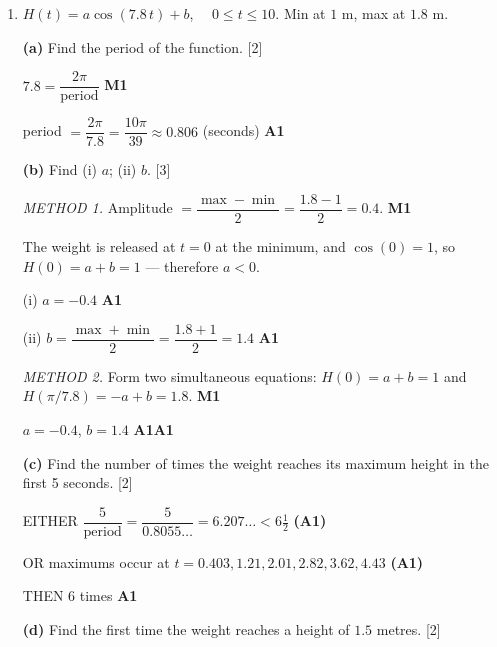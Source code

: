 \documentclass[12pt, twoside]{article}
\begin{document}
\begin{enumerate}[itemsep=0.3cm]
$= 20.8$ (metres) \hfill \textbf{A1}

\bigskip
\hrule
\bigskip

\item[2.] [Maximum mark: 13]

$H(t) = a\cos(7.8\,t) + b$, $\quad 0 \le t \le 10$. Min at $1$ m, max at $1.8$ m.

\medskip

\textbf{(a)} Find the period of the function. \hfill [2]

\medskip

$7.8 = \dfrac{2\pi}{\text{period}}$ \hfill \textbf{M1}

period $= \dfrac{2\pi}{7.8} = \dfrac{10\pi}{39} \approx 0.806$ (seconds) \hfill \textbf{A1}

\medskip

\textbf{(b)} Find (i) $a$; \quad (ii) $b$. \hfill [3]

\medskip

\emph{METHOD 1.} Amplitude $= \dfrac{\max - \min}{2} = \dfrac{1.8 - 1}{2} = 0.4$. \hfill \textbf{M1}

The weight is released at $t = 0$ at the minimum, and $\cos(0) = 1$, so $H(0) = a + b = 1$ — therefore $a < 0$.

(i) $a = -0.4$ \hfill \textbf{A1}

(ii) $b = \dfrac{\max + \min}{2} = \dfrac{1.8 + 1}{2} = 1.4$ \hfill \textbf{A1}

\medskip

\emph{METHOD 2.} Form two simultaneous equations: $H(0) = a + b = 1$ and $H(\pi/7.8) = -a + b = 1.8$. \hfill \textbf{M1}

$a = -0.4$, $b = 1.4$ \hfill \textbf{A1A1}

\medskip

\textbf{(c)} Find the number of times the weight reaches its maximum height in the first 5 seconds. \hfill [2]

\medskip

EITHER $\dfrac{5}{\text{period}} = \dfrac{5}{0.8055\ldots} = 6.207\ldots < 6\tfrac{1}{2}$ \hfill \textbf{(A1)}

OR maximums occur at $t = 0.403, 1.21, 2.01, 2.82, 3.62, 4.43$ \hfill \textbf{(A1)}

THEN $6$ times \hfill \textbf{A1}

\medskip

\textbf{(d)} Find the first time the weight reaches a height of $1.5$ metres. \hfill [2]


\end{enumerate}
\end{document}
